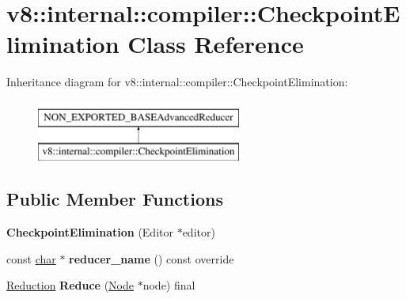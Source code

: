 \hypertarget{classv8_1_1internal_1_1compiler_1_1CheckpointElimination}{}\section{v8\+:\+:internal\+:\+:compiler\+:\+:Checkpoint\+Elimination Class Reference}
\label{classv8_1_1internal_1_1compiler_1_1CheckpointElimination}
Inheritance diagram for v8\+:\+:internal\+:\+:compiler\+:\+:Checkpoint\+Elimination\+:\begin{figure}[H]
\begin{center}
\leavevmode
\includegraphics[height=2.000000cm]{classv8_1_1internal_1_1compiler_1_1CheckpointElimination}
\end{center}
\end{figure}
\subsection*{Public Member Functions}
\begin{DoxyCompactItemize}
\item 
\mbox{\label{classv8_1_1internal_1_1compiler_1_1CheckpointElimination_a8c95f59afa08ec6d507b33f0f42a071e}} 
{\bfseries Checkpoint\+Elimination} (Editor $\ast$editor)
\item 
\mbox{\label{classv8_1_1internal_1_1compiler_1_1CheckpointElimination_a31cde25e266d1da05beb4f0d0e2853a9}} 
const \mbox{\hyperlink{classchar}{char}} $\ast$ {\bfseries reducer\+\_\+name} () const override
\item 
\mbox{\label{classv8_1_1internal_1_1compiler_1_1CheckpointElimination_acafedd52e6fea3a1bb90a4645aeceec3}} 
\mbox{\hyperlink{classv8_1_1internal_1_1compiler_1_1Reduction}{Reduction}} {\bfseries Reduce} (\mbox{\hyperlink{classv8_1_1internal_1_1compiler_1_1Node}{Node}} $\ast$node) final
\end{DoxyCompactItemize}


